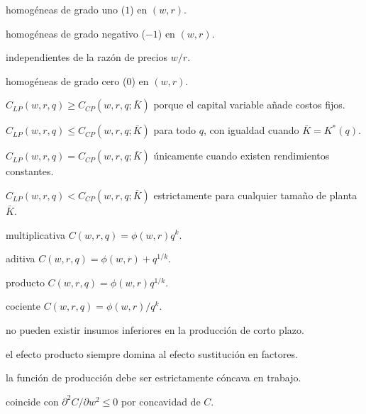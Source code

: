 \begin{opts}
    \item homogéneas de grado uno ($1$) en $(w,r)$.
    \item homogéneas de grado negativo ($-1$) en $(w,r)$.
    \item independientes de la razón de precios $w/r$.
    \item homogéneas de grado cero ($0$) en $(w,r)$.
\end{opts}

\begin{opts}
    \item $C_{LP}(w,r,q) \ge C_{CP}(w,r,q;\bar{K})$ porque el capital variable añade costos fijos.
    \item $C_{LP}(w,r,q) \le C_{CP}(w,r,q;\bar{K})$ para todo $q$, con igualdad cuando $\bar{K} = K^*(q)$.
    \item $C_{LP}(w,r,q) = C_{CP}(w,r,q;\bar{K})$ únicamente cuando existen rendimientos constantes.
    \item $C_{LP}(w,r,q) < C_{CP}(w,r,q;\bar{K})$ estrictamente para cualquier tamaño de planta $\bar{K}$.
\end{opts}

\begin{opts}
    \item multiplicativa $C(w,r,q) = \phi(w,r) q^{k}$.
    \item aditiva $C(w,r,q) = \phi(w,r) + q^{1/k}$.
    \item producto $C(w,r,q) = \phi(w,r) q^{1/k}$.
    \item cociente $C(w,r,q) = \phi(w,r) / q^{k}$.
\end{opts}

\begin{opts}
    \item no pueden existir insumos inferiores en la producción de corto plazo.
    \item el efecto producto siempre domina al efecto sustitución en factores.
    \item la función de producción debe ser estrictamente cóncava en trabajo.
    \item coincide con $\partial^2 C/\partial w^2 \le 0$ por concavidad de $C$.
\end{opts}

